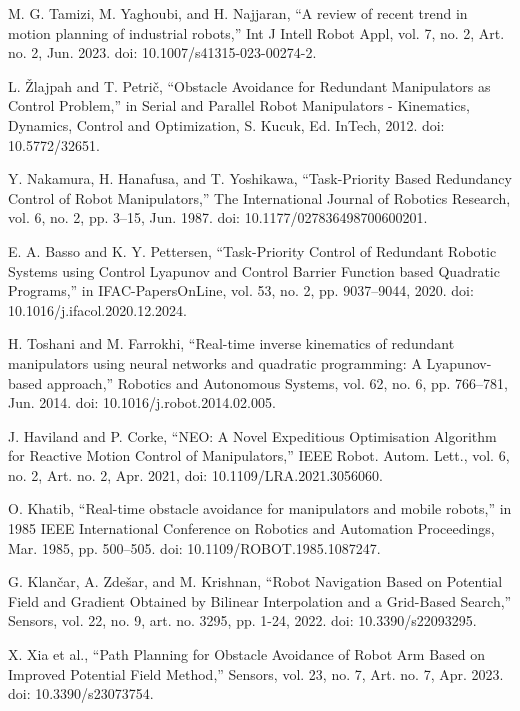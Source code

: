 \documentclass[letterpaper, 10 pt, conference]{ieeeconf}  %
\begin{document}
\begin{thebibliography}{99}
	
 M. G. Tamizi, M. Yaghoubi, and H. Najjaran, “A review of recent trend in motion planning of industrial robots,” Int J Intell Robot Appl, vol. 7, no. 2, Art. no. 2, Jun. 2023. doi: 10.1007/s41315-023-00274-2.

 L. Žlajpah and T. Petrič, “Obstacle Avoidance for Redundant Manipulators as Control Problem,” in Serial and Parallel Robot Manipulators - Kinematics, Dynamics, Control and Optimization, S. Kucuk, Ed. InTech, 2012. doi: 10.5772/32651.

 Y. Nakamura, H. Hanafusa, and T. Yoshikawa, “Task-Priority Based Redundancy Control of Robot Manipulators,” The International Journal of Robotics Research, vol. 6, no. 2, pp. 3–15, Jun. 1987. doi: 10.1177/027836498700600201.

 E. A. Basso and K. Y. Pettersen, “Task-Priority Control of Redundant Robotic Systems using Control Lyapunov and Control Barrier Function based Quadratic Programs,” in IFAC-PapersOnLine, vol. 53, no. 2, pp. 9037–9044, 2020. doi: 10.1016/j.ifacol.2020.12.2024.

 H. Toshani and M. Farrokhi, “Real-time inverse kinematics of redundant manipulators using neural networks and quadratic programming: A Lyapunov-based approach,” Robotics and Autonomous Systems, vol. 62, no. 6, pp. 766–781, Jun. 2014. doi: 10.1016/j.robot.2014.02.005.

 J. Haviland and P. Corke, “NEO: A Novel Expeditious Optimisation Algorithm for Reactive Motion Control of Manipulators,” IEEE Robot. Autom. Lett., vol. 6, no. 2, Art. no. 2, Apr. 2021, doi: 10.1109/LRA.2021.3056060.

 O. Khatib, “Real-time obstacle avoidance for manipulators and mobile robots,” in 1985 IEEE International Conference on Robotics and Automation Proceedings, Mar. 1985, pp. 500–505. doi: 10.1109/ROBOT.1985.1087247.

G. Klančar, A. Zdešar, and M. Krishnan, “Robot Navigation Based on Potential Field and Gradient Obtained by Bilinear Interpolation and a Grid-Based Search,” Sensors, vol. 22, no. 9, art. no. 3295, pp. 1-24, 2022. doi: 10.3390/s22093295.

 X. Xia et al., “Path Planning for Obstacle Avoidance of Robot Arm Based on Improved Potential Field Method,” Sensors, vol. 23, no. 7, Art. no. 7, Apr. 2023. doi: 10.3390/s23073754.


\end{thebibliography}
\end{document}
